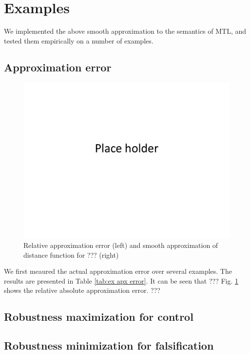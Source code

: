 \section{Examples}
\label{sec:examples}
We implemented the above smooth approximation to the semantics of MTL, and tested them empirically on a number of examples.

\subsection{Approximation error}
\label{sec: ex apx error}
\begin{figure}[t]
\centering
\includegraphics[width=0.7\linewidth]{figures/placeHolder}
\caption{Relative approximation error (left) and smooth approximation of distance function for ??? (right)}
\label{fig:sample result}
\end{figure}
We first meaured the actual approximation error over several examples.
The results are presented in Table \ref{tab:ex apx error}.
It can be seen that ???
Fig. \ref{fig:sample result} shows the relative absolute approximation error.
???

\subsection{Robustness maximization for control}
\label{sec:toy example}

\subsection{Robustness minimization for falsification}
\label{sec:toy falsification}
